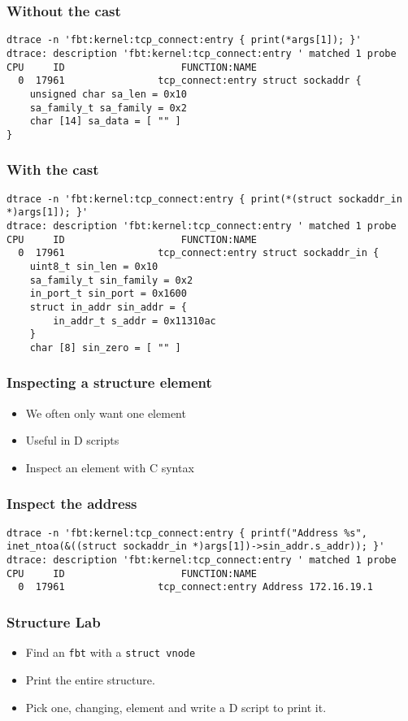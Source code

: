 \documentclass[pdftex]{beamer}
\begin{document}
\begin{frame}[fragile]
  \frametitle{Without the cast}
\begin{lstlisting}
dtrace -n 'fbt:kernel:tcp_connect:entry { print(*args[1]); }'
dtrace: description 'fbt:kernel:tcp_connect:entry ' matched 1 probe
CPU     ID                    FUNCTION:NAME
  0  17961                tcp_connect:entry struct sockaddr {
    unsigned char sa_len = 0x10
    sa_family_t sa_family = 0x2
    char [14] sa_data = [ "" ]
}\end{lstlisting}
\end{frame}

\begin{frame}[fragile]
  \frametitle{With the cast}
\begin{lstlisting}
dtrace -n 'fbt:kernel:tcp_connect:entry { print(*(struct sockaddr_in *)args[1]); }'
dtrace: description 'fbt:kernel:tcp_connect:entry ' matched 1 probe
CPU     ID                    FUNCTION:NAME
  0  17961                tcp_connect:entry struct sockaddr_in {
    uint8_t sin_len = 0x10
    sa_family_t sin_family = 0x2
    in_port_t sin_port = 0x1600
    struct in_addr sin_addr = {
        in_addr_t s_addr = 0x11310ac
    }
    char [8] sin_zero = [ "" ]
\end{lstlisting}
\end{frame}

\begin{frame}
  \frametitle{Inspecting a structure element}
  \begin{itemize}
  \item We often only want one element
  \item Useful in D scripts
  \item Inspect an element with C syntax
  \end{itemize}
\end{frame}

\begin{frame}[fragile]
  \frametitle{Inspect the address}
\begin{lstlisting}
dtrace -n 'fbt:kernel:tcp_connect:entry { printf("Address %s", inet_ntoa(&((struct sockaddr_in *)args[1])->sin_addr.s_addr)); }'
dtrace: description 'fbt:kernel:tcp_connect:entry ' matched 1 probe
CPU     ID                    FUNCTION:NAME
  0  17961                tcp_connect:entry Address 172.16.19.1
\end{lstlisting}
\end{frame}

\begin{frame}[fragile]
  \frametitle{Structure Lab}
  \begin{itemize}
  \item Find an \verb+fbt+ with a \verb+struct vnode+
  \item Print the entire structure.
  \item Pick one, changing, element and write a D script to print it.
  \end{itemize}
\end{frame}
\end{document}
